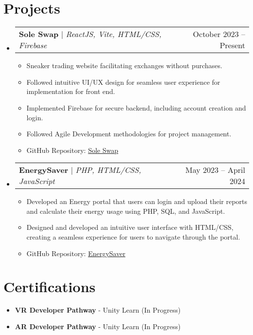 \documentclass[letterpaper,11pt]{article}
\makeatletter
\newcommand{\resumeItem}[1]{
  \item\small{
    {#1 \vspace{-2pt}}
  }
}
\newcommand{\resumeProjectHeading}[2]{
    \item
    \begin{tabular*}{0.97\textwidth}{l@{\extracolsep{\fill}}r}
      \small#1 & #2 \\
    \end{tabular*}\vspace{-7pt}
}
\newcommand{\resumeSubHeadingListStart}{\begin{itemize}[leftmargin=0.15in, label={}]}
\newcommand{\resumeSubHeadingListEnd}{\end{itemize}}
\newcommand{\resumeItemListStart}{\begin{itemize}}
\newcommand{\resumeItemListEnd}{\end{itemize}\vspace{-5pt}}
\makeatother
\begin{document}
\section{Projects}
    \resumeSubHeadingListStart
      \resumeProjectHeading
          {\textbf{Sole Swap} $|$ \emph{ReactJS, Vite, HTML/CSS, Firebase}}{October 2023 -- Present}
          \resumeItemListStart
            \resumeItem{Sneaker trading website facilitating exchanges without purchases.}
            \resumeItem{Followed intuitive UI/UX design for seamless user experience for implementation for front end.}
            \resumeItem{Implemented Firebase for secure backend, including account creation and login.}
            \resumeItem{Followed Agile Development methodologies for project management.}
            \resumeItem{GitHub Repository: \href{https://github.com/ShaniaB417/Sole-Swap}{Sole Swap}}
          \resumeItemListEnd
      \resumeProjectHeading
          {\textbf{EnergySaver} $|$ \emph{PHP, HTML/CSS, JavaScript}}{May 2023 -- April 2024}
          \resumeItemListStart
            \resumeItem{Developed an Energy portal that users can login and upload their reports and calculate their energy usage using PHP, SQL, and JavaScript.}
            \resumeItem{Designed and developed an intuitive user interface with HTML/CSS, creating a seamless experience for users to navigate through the portal.}
            \resumeItem{GitHub Repository: \href{https://github.com/ShaniaB417/EnergySaver}{EnergySaver}}
          \resumeItemListEnd
    \resumeSubHeadingListEnd

\section{Certifications}
  \resumeSubHeadingListStart
    \item{\textbf{VR Developer Pathway  } - Unity Learn (In Progress)}
    \item{\textbf{AR Developer Pathway } - Unity Learn (In Progress)}
  \resumeSubHeadingListEnd


%
\end{document}
